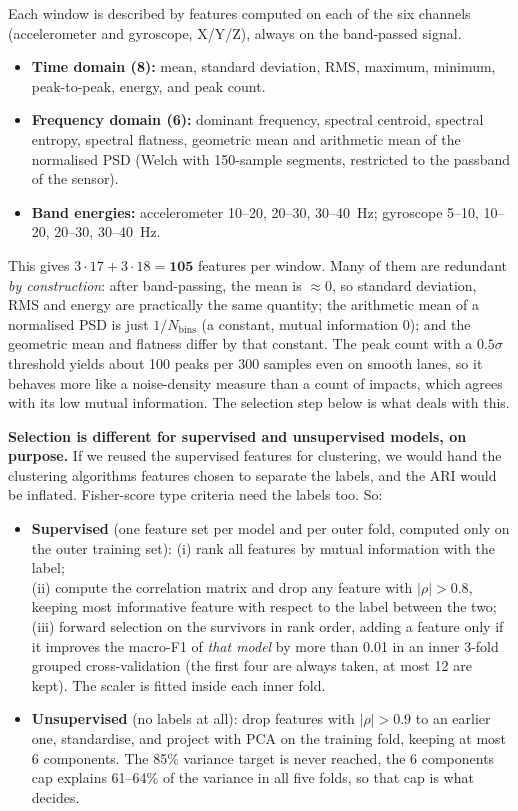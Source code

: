 \documentclass[10pt,a4paper]{article}
\begin{document}
Each window is described by features computed on each of the six channels (accelerometer and gyroscope, X/Y/Z), always on the band-passed signal.
\begin{itemize}
  \item \textbf{Time domain (8):} mean, standard deviation, RMS, maximum, minimum, peak-to-peak, energy, and peak count.
  \item \textbf{Frequency domain (6):} dominant frequency, spectral centroid, spectral entropy, spectral flatness, geometric mean and arithmetic mean of the normalised PSD (Welch with 150-sample segments, restricted to the passband of the sensor).
  \item \textbf{Band energies:} accelerometer 10--20, 20--30, 30--40~Hz; gyroscope 5--10, 10--20, 20--30, 30--40~Hz.
\end{itemize}
This gives $3\cdot17+3\cdot18=\mathbf{105}$ features per window. Many of them are redundant \emph{by construction}: after band-passing, the mean is $\approx0$, so standard deviation, RMS and energy are practically the same quantity; the arithmetic mean of a normalised PSD is just $1/N_{\mathrm{bins}}$ (a constant, mutual information 0); and the geometric mean and flatness differ by that constant. The peak count with a $0.5\sigma$ threshold yields about 100 peaks per 300 samples even on smooth lanes, so it behaves more like a noise-density measure than a count of impacts, which agrees with its low mutual information. The selection step below is what deals with this.

\textbf{Selection is different for supervised and unsupervised models, on purpose.} If we reused the supervised features for clustering, we would hand the clustering algorithms features chosen to separate the labels, and the ARI would be inflated. Fisher-score type criteria need the labels too. So:
\begin{itemize}
  \item \textbf{Supervised} (one feature set per model and per outer fold, computed only on the outer training set): \newline 
  (i) rank all features by mutual information with the label; \\
  (ii) compute the correlation matrix and drop any feature with $|\rho|>0.8$, keeping most informative feature with respect to the label between the two; \\
  (iii) forward selection on the survivors in rank order, adding a feature only if it improves the macro-F1 of \emph{that model} by more than 0.01 in an inner 3-fold grouped cross-validation (the first four are always taken, at most 12 are kept). The scaler is fitted inside each inner fold. \\
  \item \textbf{Unsupervised} (no labels at all): drop features with $|\rho|>0.9$ to an earlier one, standardise, and project with PCA on the training fold, keeping at most 6 components. The 85\% variance target is never reached, the 6 components cap explains 61--64\% of the variance in all five folds, so that cap is what decides.
\end{itemize}
\\
\end{document}

